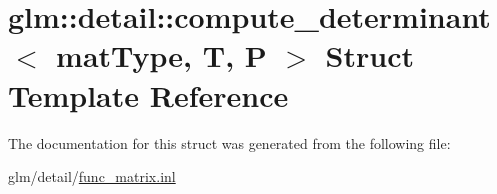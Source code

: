 \hypertarget{structglm_1_1detail_1_1compute__determinant}{\section{glm\-:\-:detail\-:\-:compute\-\_\-determinant$<$ mat\-Type, T, P $>$ Struct Template Reference}
\label{structglm_1_1detail_1_1compute__determinant}
}


The documentation for this struct was generated from the following file\-:\begin{DoxyCompactItemize}
\item 
glm/detail/\hyperlink{func__matrix_8inl}{func\-\_\-matrix.\-inl}\end{DoxyCompactItemize}
